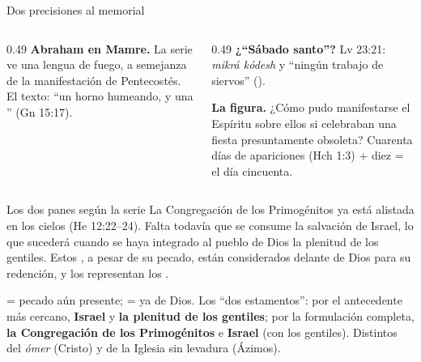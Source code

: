 \begin{frame}{Dos precisiones al memorial}
\begin{columns}[t,onlytextwidth]
\begin{column}{0.49\textwidth}\small\RaggedRight
\textbf{Abraham en Mamre.} La serie ve una lengua de fuego, a semejanza de la manifestación de Pentecostés. El texto: ``un horno humeando, y una '' (Gn 15:17).\par\smallskip
{}
\end{column}
\begin{column}{0.49\textwidth}\small\RaggedRight
\textbf{¿``Sábado santo''?} Lv 23:21: \emph{mikrá kódesh} y ``ningún trabajo de siervos'' ().\par\smallskip
{}\par\medskip
\textbf{La figura.} ¿Cómo pudo manifestarse el Espíritu sobre ellos si celebraban una fiesta presuntamente obsoleta? Cuarenta días de apariciones (Hch 1:3) + diez = el día cincuenta.
\end{column}
\end{columns}
\end{frame}

\begin{frame}{Los dos panes según la serie}
\small\RaggedRight La Congregación de los Primogénitos ya está alistada en los cielos (He 12:22--24). Falta todavía que se consume la salvación de Israel, lo que sucederá cuando se haya integrado al pueblo de Dios la plenitud de los gentiles. Estos , a pesar de su pecado, están considerados delante de Dios para su redención, y los representan los .\par\medskip
\small\RaggedRight {} = pecado aún presente;  = ya de Dios. Los ``dos estamentos'': por el antecedente más cercano, \textbf{Israel} y \textbf{la plenitud de los gentiles}; por la formulación completa, \textbf{la Congregación de los Primogénitos} e \textbf{Israel} (con los gentiles). Distintos del \emph{ómer} (Cristo) y de la Iglesia sin levadura (Ázimos).
\end{frame}

